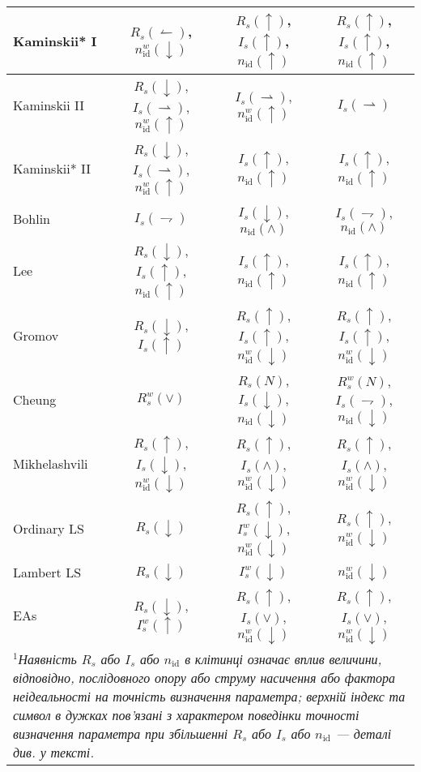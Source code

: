 \begin{table}
\begin{tabular}{|l|c|c|c|}
\hline
Kaminskii* I&$R_s(\leftharpoonup)$, $n_\mathrm{id}^w(\downarrow)$&$R_s(\uparrow)$, $I_s(\uparrow)$, $n_\mathrm{id}(\uparrow)$& $R_s(\uparrow)$, $I_s(\uparrow)$, $n_\mathrm{id}(\uparrow)$\\
\hline
Kaminskii II&$R_s(\downarrow)$, $I_s(\rightharpoonup)$, $n_\mathrm{id}^w(\uparrow)$&$I_s(\rightharpoonup)$, $n_\mathrm{id}^w(\uparrow)$& $I_s(\rightharpoonup)$\\
\hline
Kaminskii* II&$R_s(\downarrow)$, $I_s(\rightharpoonup)$, $n_\mathrm{id}^w(\uparrow)$&$I_s(\uparrow)$, $n_\mathrm{id}(\uparrow)$& $I_s(\uparrow)$, $n_\mathrm{id}(\uparrow)$\\
\hline
Bohlin &$I_s(\rightharpoondown)$&$I_s(\downarrow)$, $n_\mathrm{id}(\wedge)$& $I_s(\rightharpoondown)$, $n_\mathrm{id}(\wedge)$\\
\hline
Lee &$R_s(\downarrow)$, $I_s(\uparrow)$, $n_\mathrm{id}(\uparrow)$&$I_s(\uparrow)$, $n_\mathrm{id}(\uparrow)$& $I_s(\uparrow)$, $n_\mathrm{id}(\uparrow)$\\
\hline
Gromov &$R_s(\downarrow)$, $I_s(\uparrow)$&$R_s(\uparrow)$, $I_s(\uparrow)$, $n_\mathrm{id}^w(\downarrow)$&$R_s(\uparrow)$, $I_s(\uparrow)$, $n_\mathrm{id}^w(\downarrow)$\\
\hline
Cheung &$R_s^w(\vee)$&$R_s(N)$, $I_s(\downarrow)$, $n_\mathrm{id}(\downarrow)$&$R_s^w(N)$, $I_s(\rightharpoondown)$, $n_\mathrm{id}(\downarrow)$\\
\hline
Mikhelashvili &$R_s(\uparrow)$, $I_s(\downarrow)$, $n_\mathrm{id}^w(\downarrow)$&$R_s(\uparrow)$, $I_s(\wedge)$, $n_\mathrm{id}^w(\downarrow)$&$R_s(\uparrow)$, $I_s(\wedge)$, $n_\mathrm{id}^w(\downarrow)$\\
\hline
Ordinary LS &$R_s(\downarrow)$&$R_s(\uparrow)$, $I_s^w(\downarrow)$, $n_\mathrm{id}^w(\downarrow)$&$R_s(\uparrow)$, $n_\mathrm{id}^w(\downarrow)$\\
\hline
Lambert LS &$R_s(\downarrow)$&$I_s^w(\downarrow)$&$n_\mathrm{id}^w(\downarrow)$\\
\hline
EAs &$R_s(\downarrow)$, $I_s^w(\uparrow)$&$R_s(\uparrow)$, $I_s(\vee)$, $n_\mathrm{id}^w(\downarrow)$&$R_s(\uparrow)$, $I_s(\vee)$, $n_\mathrm{id}^w(\downarrow)$\\
\hline
\multicolumn{4}{|p{0.9\textwidth}|}{$^{1}$\textit{Наявність $R_s$ або $I_s$ або $n_\mathrm{id}$ в клітинці означає
вплив величини, відповідно, послідовного опору або струму насичення або фактора неідеальності на точність визначення параметра;
верхній індекс та символ в дужках пов'язані з характером поведінки точності визначення параметра при збільшенні $R_s$ або $I_s$ або $n_\mathrm{id}$ --- деталі див. у тексті.
}}\\
\hline
\end{tabular}
\end{table}

